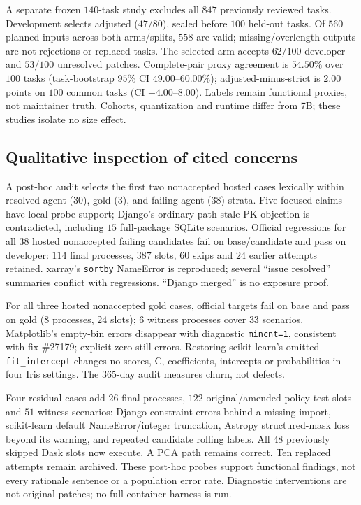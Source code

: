 \documentclass[10pt,conference]{IEEEtran}
\begin{document}
A separate frozen $140$-task study excludes all $847$ previously reviewed tasks.
Development selects adjusted ($47/80$), sealed
before $100$ held-out tasks. Of $560$ planned inputs across both arms/splits,
$558$ are valid;
missing/overlength outputs are not rejections or replaced tasks. The selected arm
accepts $62/100$ developer and
$53/100$ unresolved patches.
Complete-pair proxy agreement is $54.50\%$ over
$100$ tasks (task-bootstrap $95\%$ CI $49.00$--$60.00\%$);
adjusted-minus-strict is $2.00$ points on $100$ common tasks
(CI $-4.00$--$8.00$). Labels remain functional proxies, not maintainer truth.
Cohorts, quantization and runtime differ from 7B; these studies isolate no size effect.

\subsection{Qualitative inspection of cited concerns}
A post-hoc audit selects the first two nonaccepted hosted cases lexically
within resolved-agent ($30$), gold ($3$), and failing-agent ($38$) strata.
Five focused claims have local probe support; Django's ordinary-path stale-PK objection is
contradicted, including $15$ full-package SQLite scenarios. Official regressions
for all $38$ hosted nonaccepted failing candidates fail on base/candidate and
pass on developer: $114$ final processes, $387$ slots, $60$ skips and $24$ earlier
attempts retained. xarray's \texttt{sortby} NameError is reproduced; several
``issue resolved'' summaries conflict with regressions. ``Django merged'' is no exposure proof.

For all three hosted nonaccepted gold cases, official targets fail on base and
pass on gold ($8$ processes, $24$ slots); $6$ witness processes cover $33$ scenarios.
Matplotlib's empty-bin errors disappear with diagnostic \texttt{mincnt=1},
consistent with fix \#27179; explicit zero still errors. Restoring scikit-learn's
omitted \texttt{fit\_intercept} changes no scores, C, coefficients, intercepts
or probabilities in four Iris settings. The $365$-day audit measures churn, not defects.

Four residual cases add $26$ final processes, $122$ original/amended-policy test
slots and $51$ witness scenarios: Django constraint errors behind a missing import,
scikit-learn default NameError/integer truncation, Astropy structured-mask loss
beyond its warning, and repeated candidate rolling labels. All $48$ previously skipped
Dask slots now execute. A PCA path remains correct. Ten replaced attempts remain archived.
These post-hoc probes support functional findings, not every rationale sentence
or a population error rate. Diagnostic interventions are not original patches;
no full container harness is run.
\end{document}
